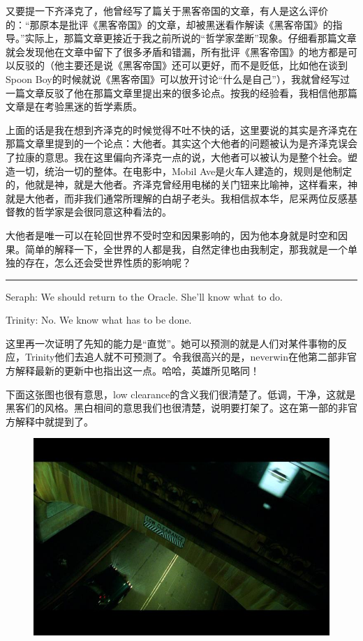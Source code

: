 \documentclass[UTF8]{ctexart}
\newcommand{\myparsep}{\noindent \rule[0.5ex]{\linewidth}{1pt}}
\newenvironment{myquote}{\color{green} \setlength{\leftskip}{6em} \setlength{\rightskip}{4em} \setlength{\parindent}{-2em}}{\par}
\begin{document}
又要提一下齐泽克了，他曾经写了篇关于黑客帝国的文章，有人是这么评价的：“那原本是批评《黑客帝国》的文章，却被黑迷看作解读《黑客帝国》的指导。”实际上，那篇文章更接近于我之前所说的“哲学家垄断”现象。仔细看那篇文章就会发现他在文章中留下了很多矛盾和错漏，所有批评《黑客帝国》的地方都是可以反驳的（他主要还是说《黑客帝国》还可以更好，而不是贬低，比如他在谈到Spoon Boy的时候就说《黑客帝国》可以放开讨论“什么是自己”），我就曾经写过一篇文章反驳了他在那篇文章里提出来的很多论点。按我的经验看，我相信他那篇文章是在考验黑迷的哲学素质。

上面的话是我在想到齐泽克的时候觉得不吐不快的话，这里要说的其实是齐泽克在那篇文章里提到的一个论点：大他者。其实这个大他者的问题被认为是齐泽克误会了拉康的意思。我在这里偏向齐泽克一点的说，大他者可以被认为是整个社会。塑造一切，统治一切的整体。在电影中，Mobil Ave是火车人建造的，规则是他制定的，他就是神，就是大他者。齐泽克曾经用电梯的关门钮来比喻神，这样看来，神就是大他者，而非我们通常所理解的白胡子老头。我相信叔本华，尼采两位反感基督教的哲学家是会很同意这种看法的。

大他者是唯一可以在轮回世界不受时空和因果影响的，因为他本身就是时空和因果。简单的解释一下，全世界的人都是我，自然定律也由我制定，那我就是一个单独的存在，怎么还会受世界性质的影响呢？

\myparsep

\begin{myquote}
Seraph: We should return to the Oracle. She'll know what to do.

Trinity: No. We know what has to be done.
\end{myquote}

这里再一次证明了先知的能力是“直觉”。她可以预测的就是人们对某件事物的反应，Trinity他们去追人就不可预测了。令我很高兴的是，neverwin在他第二部非官方解释最新的更新中也指出这一点。哈哈，英雄所见略同！

下面这张图也很有意思，low clearance的含义我们很清楚了。低调，干净，这就是黑客们的风格。黑白相间的意思我们也很清楚，说明要打架了。这在第一部的非官方解释中就提到了。

\begin{figure}[htb]
\centering
\includegraphics[width=0.5\linewidth]{fig/8b758b82f42f6090f603a6f5.jpg}
\end{figure}
\end{document}
